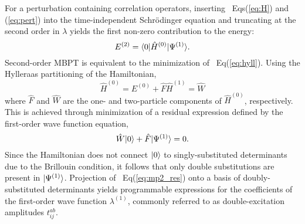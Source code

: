 For a perturbation containing correlation operators, 
inserting ~Eqs(\ref{eq:H}) and (\ref{eq:pert}) into the time-independent Schr\"odinger equation and truncating at the 
second order in $\lambda$ yields the first non-zero contribution to the energy:
\begin{equation} \label{eq:hyll}
    E^{(2)} = \langle0 |\hat{H}^{(0)}| \Psi^{(1)} \rangle.
\end{equation}
Second-order MBPT is equivalent to the minimization of ~Eq(\ref{eq:hyll}). 
Using the Hylleraas partitioning of the Hamiltonian,
\begin{subequations}
    \begin{equation}
        \hat{H}^{(0)} = E^{(0)} + \hat{F}
    \end{equation}
    \begin{equation}
        \hat{H}^{(1)} = \hat{W}
    \end{equation}
\end{subequations}
where $\hat{F}$ and $\hat{W}$ are the one- and two-particle components of $\hat{H}^{(0)}$, respectively. 
This is achieved through minimization of a residual expression defined by the first-order wave 
function equation,
\begin{equation} \label{eq:mp2_res}
    \hat{W}| 0 \rangle + \hat{F}| \Psi^{(1)} \rangle = 0.
\end{equation}
Since the Hamiltonian does not connect $| 0 \rangle$ to singly-substituted determinants due to the Brillouin condition, it follows that only double substitutions are present in $| \Psi^{(1)} \rangle$. 
Projection of ~Eq(\ref{eq:mp2_res}) onto a basis of doubly-substituted determinants yields programmable expressions for the coefficients of the first-order wave function $\lambda^{(1)}$, 
commonly referred to as double-excitation amplitudes $t^{ab}_{ij}$. 

